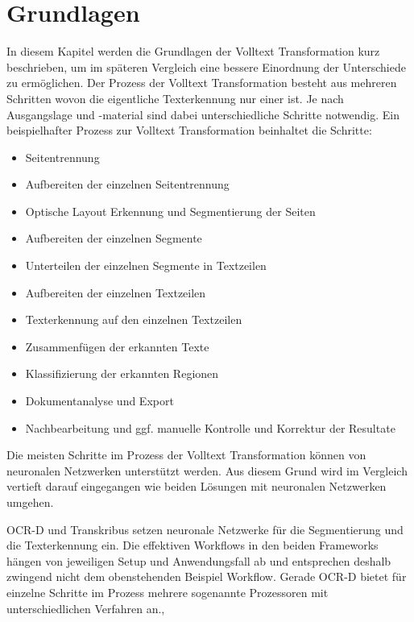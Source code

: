 \documentclass[a4paper,oneside, 12pt]{report}
\begin{document}
\chapter{Grundlagen}\label{sec:grundlagen}
In diesem Kapitel werden die Grundlagen der Volltext Transformation kurz beschrieben, um im späteren Vergleich eine bessere Einordnung der Unterschiede zu ermöglichen. Der Prozess der Volltext Transformation besteht aus mehreren Schritten wovon die eigentliche Texterkennung nur einer ist. Je nach Ausgangslage und -material sind dabei unterschiedliche Schritte notwendig. Ein beispielhafter Prozess zur Volltext Transformation beinhaltet die Schritte:
\begin{itemize}\itemsep=0.5pt
  \item Seitentrennung
  \item Aufbereiten der einzelnen Seitentrennung
  \item Optische Layout Erkennung und Segmentierung der Seiten
  \item Aufbereiten der einzelnen Segmente
  \item Unterteilen der einzelnen Segmente in Textzeilen
  \item Aufbereiten der einzelnen Textzeilen
  \item Texterkennung auf den einzelnen Textzeilen
  \item Zusammenfügen der erkannten Texte
  \item Klassifizierung der erkannten Regionen
  \item Dokumentanalyse und Export
  \item Nachbearbeitung und ggf. manuelle Kontrolle und Korrektur der Resultate
\end{itemize}

Die meisten Schritte im Prozess der Volltext Transformation können von neuronalen Netzwerken unterstützt werden. Aus diesem Grund wird im Vergleich vertieft darauf eingegangen wie beiden Lösungen mit neuronalen Netzwerken umgehen. 

OCR-D und Transkribus setzen neuronale Netzwerke für die Segmentierung und die Texterkennung ein. Die effektiven Workflows in den beiden Frameworks hängen von jeweiligen Setup und Anwendungsfall ab und entsprechen deshalb zwingend nicht dem obenstehenden Beispiel Workflow. Gerade OCR-D bietet für einzelne Schritte im Prozess mehrere sogenannte Prozessoren mit unterschiedlichen Verfahren an.\cite{transkribus}, \cite{ocrdworkflows} 
 
\end{document}
